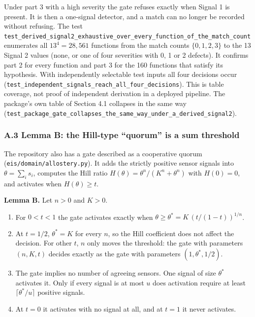 \documentclass[
  11pt,
]{article}
\providecommand{\tightlist}{%
  \setlength{\itemsep}{0pt}\setlength{\parskip}{0pt}}
\begin{document}
Under part 3 with a high severity the gate refuses exactly when Signal 1
is present. It is then a one-signal detector, and a match can no longer
be recorded without refusing. The test
\nolinkurl{test_derived_signal2_exhaustive_over_every_function_of_the_match_count}
enumerates all \(13^4 = 28{,\allowbreak }561\) functions from the match
counts \(\{0,\allowbreak  1,\allowbreak  2,\allowbreak  3\}\) to the 13
Signal 2 values (none, or one of four severities with 0, 1 or 2
defects). It confirms part 2 for every function and part 3 for the 160
functions that satisfy its hypothesis. With independently selectable
test inputs all four decisions occur
(\nolinkurl{test_independent_signals_reach_all_four_decisions}). This is
table coverage, not proof of independent derivation in a deployed
pipeline. The package's own table of Section 4.1 collapses in the same
way
(\nolinkurl{test_package_gate_collapses_the_same_way_under_a_derived_signal2}).

\subsubsection{A.3 Lemma B: the Hill-type ``quorum'' is a sum
threshold}\label{a.3-lemma-b-the-hill-type-quorum-is-a-sum-threshold}

The repository also has a gate described as a cooperative quorum
(\nolinkurl{eis/domain/allostery.py}).
It adds the strictly positive sensor signals into
\(\theta = \sum_i s_i\), computes the Hill ratio
\(H(\theta) = \theta^n / (K^n + \theta^n)\) with \(H(0) = 0\), and
activates when \(H(\theta) \geq t\).

\textbf{Lemma B.} Let \(n > 0\) and \(K > 0\).

\begin{enumerate}
\def\labelenumi{\arabic{enumi}.}
\tightlist
\item
  For \(0 < t < 1\) the gate activates exactly when
  \(\theta \geq \theta^* = K \,\allowbreak  (t / (1 - t))^{1/n}\).
\item
  At \(t = 1/2\), \(\theta^* = K\) for every \(n\), so the Hill
  coefficient does not affect the decision. For other \(t\), \(n\) only
  moves the threshold: the gate with parameters
  \((n,\allowbreak  K,\allowbreak  t)\) decides exactly as the gate with
  parameters \((1,\allowbreak  \theta^*,\allowbreak  1/2)\).
\item
  The gate implies no number of agreeing sensors. One signal of size
  \(\theta^*\) activates it. Only if every signal is at most \(u\) does
  activation require at least \(\lceil \theta^* / u \rceil\) positive
  signals.
\item
  At \(t = 0\) it activates with no signal at all, and at \(t = 1\) it
  never activates.
\end{enumerate}
\end{document}
